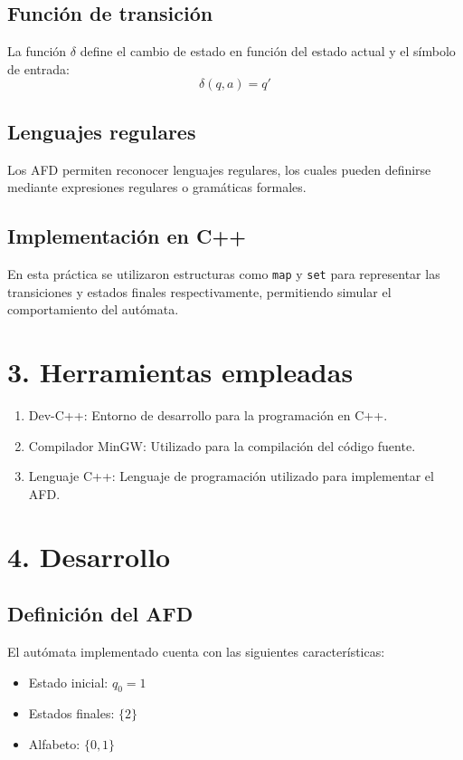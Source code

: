 \documentclass{article}
\begin{document}
\subsection{Función de transición}
La función $\delta$ define el cambio de estado en función del estado actual y el símbolo de entrada:
\[
\delta(q, a) = q'
\]

\subsection{Lenguajes regulares}
Los AFD permiten reconocer lenguajes regulares, los cuales pueden definirse mediante expresiones regulares o gramáticas formales.

\subsection{Implementación en C++}
En esta práctica se utilizaron estructuras como \texttt{map} y \texttt{set} para representar las transiciones y estados finales respectivamente, permitiendo simular el comportamiento del autómata.
\newpage
    
\section{3. Herramientas empleadas}
\begin{enumerate}
    \item Dev-C++: Entorno de desarrollo para la programación en C++.
    \item Compilador MinGW: Utilizado para la compilación del código fuente.
    \item Lenguaje C++: Lenguaje de programación utilizado para implementar el AFD.
\end{enumerate}

    
\section{4. Desarrollo}

\subsection{Definición del AFD}
El autómata implementado cuenta con las siguientes características:

\begin{itemize}
    \item Estado inicial: $q_0 = 1$
    \item Estados finales: $\{2\}$
    \item Alfabeto: $\{0,1\}$
\end{itemize}
\end{document}
